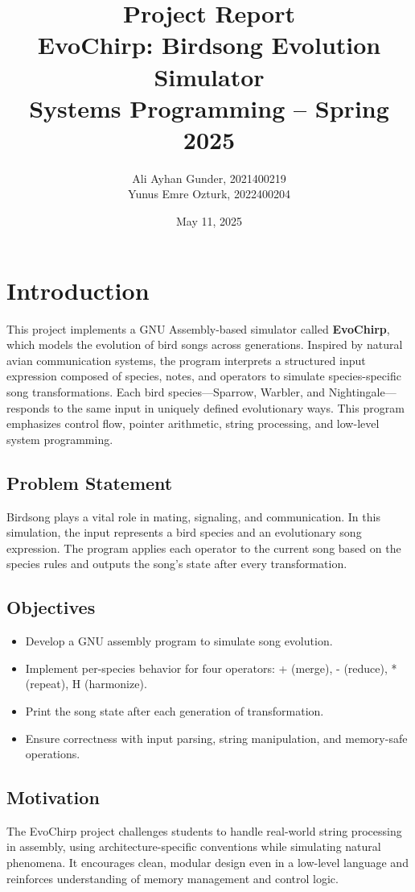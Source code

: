\documentclass[11pt]{article}
\title{Project Report \\ EvoChirp: Birdsong Evolution Simulator \\ \large{Systems Programming -- Spring 2025}}
\author{Ali Ayhan Gunder, 2021400219 \\ Yunus Emre Ozturk, 2022400204}
\date{May 11, 2025}
\begin{document}
\maketitle

\tableofcontents

\section{Introduction}
This project implements a GNU Assembly-based simulator called \textbf{EvoChirp}, which models the evolution of bird songs across generations. Inspired by natural avian communication systems, the program interprets a structured input expression composed of species, notes, and operators to simulate species-specific song transformations. Each bird species---Sparrow, Warbler, and Nightingale---responds to the same input in uniquely defined evolutionary ways. This program emphasizes control flow, pointer arithmetic, string processing, and low-level system programming.

\subsection{Problem Statement}
Birdsong plays a vital role in mating, signaling, and communication. In this simulation, the input represents a bird species and an evolutionary song expression. The program applies each operator to the current song based on the species rules and outputs the song's state after every transformation.

\subsection{Objectives}
\begin{itemize}[noitemsep]
    \item Develop a GNU assembly program to simulate song evolution.
    \item Implement per-species behavior for four operators: + (merge), - (reduce), * (repeat), H (harmonize).
    \item Print the song state after each generation of transformation.
    \item Ensure correctness with input parsing, string manipulation, and memory-safe operations.
\end{itemize}

\subsection{Motivation}
The EvoChirp project challenges students to handle real-world string processing in assembly, using architecture-specific conventions while simulating natural phenomena. It encourages clean, modular design even in a low-level language and reinforces understanding of memory management and control logic.
\end{document}

